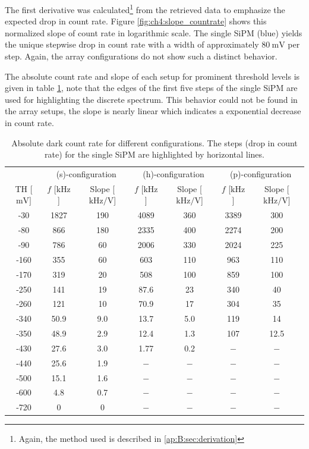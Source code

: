 The first derivative was calculated\footnote{Again, the method used is described in \ref{ap:B:sec:derivation}} from the retrieved data to emphasize the expected drop in count rate. Figure \ref{fig:ch4:slope_countrate} shows this normalized slope of count rate in logarithmic scale. The single SiPM (blue) yields the unique stepwise drop in count rate with a width of approximately $\SI{80}{\milli\volt}$ per step. Again, the array configurations do not show such a distinct behavior. \par 
The absolute count rate and slope of each setup for prominent threshold levels is given in table \ref{ch4:tab:count_rate}, note that the edges of the first five steps of the single SiPM are used for highlighting the discrete spectrum. This behavior could not be found in the array setups, the slope is nearly linear which indicates a exponential decrease in count rate. \par 

\begin{table}[t]
	\centering
	\begin{tabular}{ c|cc|cc|cc } \toprule[2pt]
		& \multicolumn{2}{c|}{(s)-configuration} & \multicolumn{2}{c|}{(h)-configuration} & \multicolumn{2}{c}{(p)-configuration} \\
		TH [$\si{\milli\volt}]$ & $f$ [$\si{\kilo\hertz}$] & Slope [$\si{\kilo\hertz\per\volt}$] & $f$ [$\si{\kilo\hertz}$] & Slope [$\si{\kilo\hertz\per\volt}$] & $f$ [$\si{\kilo\hertz}$] & Slope [$\si{\kilo\hertz\per\volt}$] \\ \midrule
		-30 & 1827 & 190 & 4089 & 360 & 3389 & 300 \\
		-80 & 866 & 180 & 2335 & 400 & 2274 & 200 \\ \midrule
		-90 & 786 & 60 & 2006 & 330 & 2024 & 225 \\
		-160 & 355 & 60 & 603 & 110 & 963 & 110 \\ \midrule
		-170 & 319 & 20 & 508 & 100 & 859 & 100 \\
		-250 & 141 & 19 & 87.6 & 23 & 340 & 40 \\ \midrule
		-260 & 121 & 10 & 70.9 & 17 & 304 & 35 \\
		-340 & 50.9 & 9.0 & 13.7 & 5.0 & 119 & 14 \\ \midrule
		-350 & 48.9 & 2.9 & 12.4 & 1.3 & 107 & 12.5 \\
		-430 & 27.6 & 3.0 & 1.77 & 0.2 & $-$ & $-$ \\ \midrule
		-440 & 25.6 & 1.9 & $-$ & $-$ &  $-$ &  $-$ \\
		-500 & 15.1 & 1.6 & $-$ &  $-$ &  $-$ &  $-$ \\
		-600 & 4.8 & 0.7 & $-$ & $-$ &  $-$ &  $-$ \\
		-720 & 0 & 0 & $-$ & $-$ &  $-$ &  $-$ \\
		\bottomrule[2pt]
	\end{tabular}
	\caption[Absolute dark count rate]{Absolute dark count rate for different configurations. The steps (drop in count rate) for the single SiPM are highlighted by horizontal lines.}
	\label{ch4:tab:count_rate}
\end{table}  

